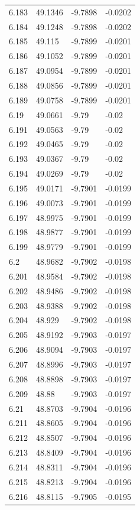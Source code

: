 \begin{tabular}{llll}
6.183 & 49.1346 & -9.7898 & -0.0202 \\
6.184 & 49.1248 & -9.7898 & -0.0202 \\
6.185 & 49.115 & -9.7899 & -0.0201 \\
6.186 & 49.1052 & -9.7899 & -0.0201 \\
6.187 & 49.0954 & -9.7899 & -0.0201 \\
6.188 & 49.0856 & -9.7899 & -0.0201 \\
6.189 & 49.0758 & -9.7899 & -0.0201 \\
6.19 & 49.0661 & -9.79 & -0.02 \\
6.191 & 49.0563 & -9.79 & -0.02 \\
6.192 & 49.0465 & -9.79 & -0.02 \\
6.193 & 49.0367 & -9.79 & -0.02 \\
6.194 & 49.0269 & -9.79 & -0.02 \\
6.195 & 49.0171 & -9.7901 & -0.0199 \\
6.196 & 49.0073 & -9.7901 & -0.0199 \\
6.197 & 48.9975 & -9.7901 & -0.0199 \\
6.198 & 48.9877 & -9.7901 & -0.0199 \\
6.199 & 48.9779 & -9.7901 & -0.0199 \\
6.2 & 48.9682 & -9.7902 & -0.0198 \\
6.201 & 48.9584 & -9.7902 & -0.0198 \\
6.202 & 48.9486 & -9.7902 & -0.0198 \\
6.203 & 48.9388 & -9.7902 & -0.0198 \\
6.204 & 48.929 & -9.7902 & -0.0198 \\
6.205 & 48.9192 & -9.7903 & -0.0197 \\
6.206 & 48.9094 & -9.7903 & -0.0197 \\
6.207 & 48.8996 & -9.7903 & -0.0197 \\
6.208 & 48.8898 & -9.7903 & -0.0197 \\
6.209 & 48.88 & -9.7903 & -0.0197 \\
6.21 & 48.8703 & -9.7904 & -0.0196 \\
6.211 & 48.8605 & -9.7904 & -0.0196 \\
6.212 & 48.8507 & -9.7904 & -0.0196 \\
6.213 & 48.8409 & -9.7904 & -0.0196 \\
6.214 & 48.8311 & -9.7904 & -0.0196 \\
6.215 & 48.8213 & -9.7904 & -0.0196 \\
6.216 & 48.8115 & -9.7905 & -0.0195 \\

\end{tabular}

